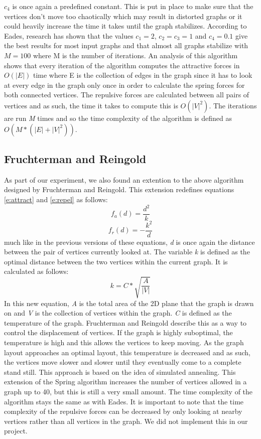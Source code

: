 \documentclass[a4paper,12pt,twoside]{article}
\begin{document}
$c_4$ is once again a predefined constant. This is put in place to make sure that the vertices don't move too chaotically which may result in distorted graphs or it could heavily increase the time it takes until the graph stabilizes.
\newline
According to Eades, research has shown that the values $c_1=2$, $c_2=c_3=1$ and $c_4=0.1$ give the best results for most input graphs and that almost all graphs stabilize with $M=100$ where M is the number of iterations.
\newline
An analysis of this algorithm shows that every iteration of the algorithm computes the attractive forces in $O(|E|)$ time where E is the collection of edges in the graph since it has to look at every edge in the graph only once in order to calculate the spring forces for both connected vertices. The repulsive forces are calculated between all pairs of vertices and as such, the time it takes to compute this is $O(|V|^2)$. The iterations are run \emph{M} times and so the time complexity of the algorithm is defined as $O(M*(|E| + |V|^2))$.
\subsection{Fruchterman and Reingold}
As part of our experiment, we also found an extention to the above algorithm designed by Fruchterman and Reingold\cite{FandR}. This extension redefines equations \ref{e:attract} and \ref{e:repel} as follows:
\begin{equation}\label{e:FRattract}
f_a(d)=\frac{d^2}{k}
\end{equation}
\begin{equation}\label{e:FRrepel}
f_r(d)=-\frac{k^2}{d}
\end{equation}
much like in the previous versions of these equations, \emph{d} is once again the distance between the pair of vertices currently looked at. The variable \emph{k} is defined as the optimal distance between the two vertices within the current graph. It is calculated as follows:
\begin{equation}\label{e:optimalD}
k=C*\sqrt{\frac{A}{|V|}}
\end{equation}
In this new equation, \emph{A} is the total area of the 2D plane that the graph is drawn on and \emph{V} is the collection of vertices within the graph. \emph{C} is defined as the temperature of the graph. Fruchterman and Reingold describe this as a way to control the displacement of vertices. If the graph is highly suboptimal, the temperature is high and this allows the vertices to keep moving. As the graph layout approaches an optimal layout, this temperature is decreased and as such, the vertices move slower and slower until they eventually come to a complete stand still. This approach is based on the idea of simulated annealing.
\newline
This extension of the Spring algorithm increases the number of vertices allowed in a graph up to 40, but this is still a very small amount. The time complexity of the algorithm stays the same as with Eades. It is important to note that the time complexity of the repulsive forces can be decreased by only looking at nearby vertices rather than all vertices in the graph. We did not implement this in our project.
\end{document}
